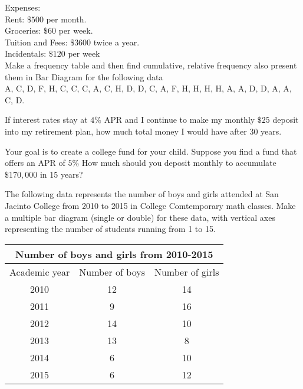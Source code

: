 \documentclass[11pt]{exam}
\begin{document}
\begin{questions}
Expenses: \\
Rent: $\$500$ per month.\\
Groceries: $\$60 $ per week.\\ 
Tuition and Fees: $\$3600$ twice a year.\\
Incidentals: $\$120$ per week \\


\newpage
\addpoints
\question[7] Make a frequency table and then find cumulative, relative frequency also present them in  Bar Diagram for the following data\\
A, C, D, F, H, C, C, C, A, C, H, D, D, C, A, F, H, H, H, H, A, A, D, D, A, A, C, D. 
\vspace{10cm}

\question[6] If interest rates stay at $4\%$ APR and I continue to make my monthly $\$25$ deposit into my retirement plan, how much total money I would have after 30 years. 
\vspace{10cm}

 
\vspace{10cm}
\question[6] Your goal is to create a college fund for your child. Suppose you find a fund that offers an APR of $5\%$ How much should you deposit monthly to accumulate $\$170,000$ in 15 years? 
\vspace{10cm}


\question[5] The following data represents the number of boys and girls attended at San Jacinto College from 2010 to 2015 in College Comtemporary math classes. Make a multiple bar diagram (single or double) for these data, with vertical axes representing the number of students running from 1 to 15.  \begin{table}[h]                           
	\centering
	\begin{tabular}{|c|c|c|}
		\hline
		\multicolumn{3}{c|}{\textbf{Number of boys and girls from 2010-2015}} \\ \hline
		
		Academic year    &   Number of boys   &   Number of girls      \\ \hline
		2010 &   12 &   14             \\ \hline          
		2011    &   9 &   16  \\ \hline
		2012       &  14 &   10           \\ \hline
		2013  &   13 &   8              \\ \hline
		2014       &  6  &   10   \\ \hline
		2015        &   6 &   12          \\ \hline
		

\end{tabular}
\end{table}
\end{questions}
\end{document}
